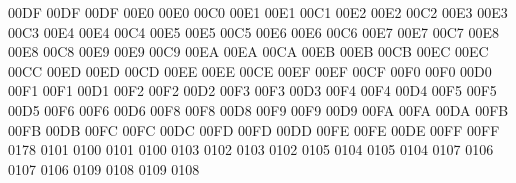 \setcclcucx 00DF 00DF 00DF %
\setcclcucx 00E0 00E0 00C0 %
\setcclcucx 00E1 00E1 00C1 %
\setcclcucx 00E2 00E2 00C2 %
\setcclcucx 00E3 00E3 00C3 %
\setcclcucx 00E4 00E4 00C4 %
\setcclcucx 00E5 00E5 00C5 %
\setcclcucx 00E6 00E6 00C6 %
\setcclcucx 00E7 00E7 00C7 %
\setcclcucx 00E8 00E8 00C8 %
\setcclcucx 00E9 00E9 00C9 %
\setcclcucx 00EA 00EA 00CA %
\setcclcucx 00EB 00EB 00CB %
\setcclcucx 00EC 00EC 00CC %
\setcclcucx 00ED 00ED 00CD %
\setcclcucx 00EE 00EE 00CE %
\setcclcucx 00EF 00EF 00CF %
\setcclcucx 00F0 00F0 00D0 %
\setcclcucx 00F1 00F1 00D1 %
\setcclcucx 00F2 00F2 00D2 %
\setcclcucx 00F3 00F3 00D3 %
\setcclcucx 00F4 00F4 00D4 %
\setcclcucx 00F5 00F5 00D5 %
\setcclcucx 00F6 00F6 00D6 %
\setcclcucx 00F8 00F8 00D8 %
\setcclcucx 00F9 00F9 00D9 %
\setcclcucx 00FA 00FA 00DA %
\setcclcucx 00FB 00FB 00DB %
\setcclcucx 00FC 00FC 00DC %
\setcclcucx 00FD 00FD 00DD %
\setcclcucx 00FE 00FE 00DE %
\setcclcucx 00FF 00FF 0178 %
 0101 0100 %
 0101 0100 %
 0103 0102 %
 0103 0102 %
 0105 0104 %
 0105 0104 %
 0107 0106 %
 0107 0106 %
 0109 0108 %
 0109 0108 %
